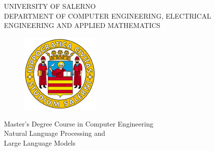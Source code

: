
\begin{titlepage}
    \begin{center}
        {\fontsize{18}{20}\selectfont\uppercase{University of Salerno}}\\
        \vspace{8mm}
        \uppercase{\large Department of Computer Engineering, Electrical
Engineering and Applied Mathematics}\\
    \end{center}
    \begin{figure}[H]
        \centering
        \includegraphics[width=0.35\textwidth]{img/logo_unisa.png}
    \end{figure}
    \vspace{2mm}
    \begin{center}
        \large{Master’s Degree Course in Computer Engineering}\\
        \vspace{4mm}
        \large{ Natural Language Processing and \\Large Language Models}\\
        \vspace{15mm}
        {\fontsize{20}{10}}\\
    \end{center}

    \vspace{25mm}
    \noindent
    \begin{minipage}[t]{0.47\textwidth}
        {\fontsize{12}{12}\selectfont{ Supervisor:\\\bf Ch.mo Prof. \\Nicola Capuano}}
    \end{minipage}
    \hfill
    \begin{minipage}[t]{0.4\textwidth}\raggedleft
        {\fontsize{12}{12}\selectfont{Candidate:: \\ \bf Nunzio Del Gaudio\\ Mat. 0622702277}}
    \end{minipage}

    \vspace{30mm}


\end{titlepage}



